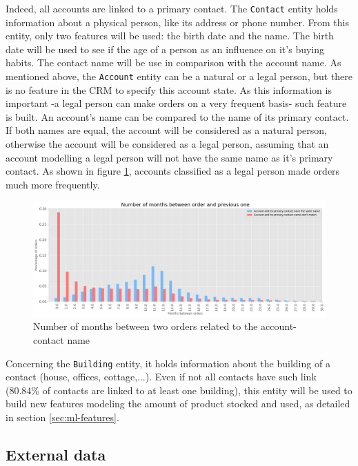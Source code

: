Indeed, all accounts are linked to a primary contact. The \texttt{Contact} entity holds information about a physical person, like its address or phone number. From this entity, only two features will be used: the birth date and the name. The birth date will be used to see if the age of a person as an influence on it's buying habits. The contact name will be use in comparison with the account name. As mentioned above, the \texttt{Account} entity can be a natural or a legal person, but there is no feature in the CRM to specify this account state. As this information is important -a legal person can make orders on a very frequent basis- such feature is built. An account's name can be compared to the name of its primary contact. If both names are equal, the account will be considered as a natural person, otherwise the account will be considered as a legal person, assuming that an account modelling a legal person will not have the same name as it's primary contact. As shown in figure \ref{fig:account-contact-name-orders}, accounts classified as a legal person made orders much more frequently.

\begin{figure}[h]
    \centering
    \includegraphics[width=15cm]{images/account-contact-name-orders.png}
    \caption{Number of months between two orders related to the account-contact name}
    \label{fig:account-contact-name-orders}
\end{figure}

Concerning the \texttt{Building} entity, it holds information about the building of a contact (house, offices, cottage,...). Even if not all contacts have such link (80.84\% of contacts are linked to at least one building), this entity will be used to build new features modeling the amount of product stocked and used, as detailed in section \ref{sec:ml-features}.


\subsection{External data}\label{sec:external-data}

